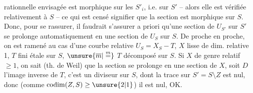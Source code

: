 rationnelle envisagée est morphique sur les $S'_i$, i.e. sur $S'$ -- alors elle est vérifiée relativement à $S$ -- ce qui est censé signifier que la section est morphique sur $S$. Donc, pour se rassurer, il faudrait s'assurer a priori qu'une section de $U_{S'}$ sur $S'$ se prolonge automatiquement en  une section de $U_S$ sur $S$. De proche en proche, on est ramené au cas d'une courbe relative $U_S=X_S-T$, $X$ lisse  de dim. relative 1, $T$ fini étale sur $S$,   $\unsure{\overline m|\overset{m}{=}}$ $T$ décomposé sur $S$. Si $X$ de genre relatif $\geq 1$, on sait (th. de Weil) que la section se prolonge en une section de $X$, soit $D$ l'image inverse de $T$, c'est un diviseur sur $S$, dont la trace sur $S'=S\setminus Z$ est nul, donc (comme $\operatorname{codim}(Z,S)\geq\unsure{2|1}$) il est nul, OK.
